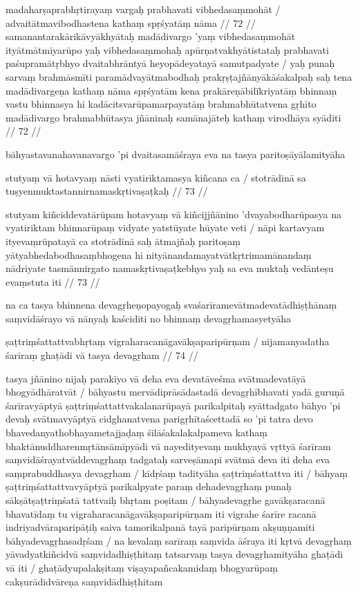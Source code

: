 madaharṣaprabhṛtirayaṃ vargaḥ prabhavati vibhedasaṃmohāt  /
advaitātmavibodhastena kathaṃ spṛśyatāṃ nāma  // 72  //
samanantarakārikāvyākhyātaḥ madādivargo 'yaṃ vibhedasaṃmohāt ityātmātmīyarūpo yaḥ vibhedasaṃmohaḥ apūrṇatvakhyātistataḥ prabhavati paśupramātṛbhyo dvaitabhrāntyā heyopādeyatayā samutpadyate  / yaḥ punaḥ sarvaṃ brahmāsmīti paramādvayātmabodhaḥ prakṛṣṭajñānyākāśakalpaḥ saḥ tena madādivargeṇa kathaṃ nāma spṛśyatām kena prakāreṇābilīkriyatāṃ bhinnaṃ vastu bhinnasya hi kadācitsvarūpamarpayatāṃ brahmabhūtatvena gṛhīto madādivargo brahmabhūtasya jñāninaḥ samānajāteḥ kathaṃ virodhāya syāditi  // 72  //

bāhyastavanahavanavargo 'pi dvaitasamāśraya eva na tasya paritoṣāyālamityāha

stutyaṃ vā hotavyaṃ nāsti vyatiriktamasya kiñcana ca  /
stotrādinā sa tuṣyenmuktastannirnamaskṛtivaṣaṭkaḥ  // 73  //

stutyam kiñciddevatārūpam hotavyaṃ vā kiñcijjñānino 'dvayabodharūpasya na vyatiriktam bhinnarūpaṃ vidyate yatstūyate hūyate veti  / nāpi kartavyam ityevaṃrūpatayā ca stotrādinā saḥ ātmajñaḥ paritoṣaṃ yātyabhedabodhasaṃbhogena hi nityānandamayatvātkṛtrimamānandaṃ nādriyate tasmānnirgato namaskṛtivaṣaṭkebhyo yaḥ sa eva muktaḥ vedānteṣu evaṃstuta iti  // 73  //

na ca tasya bhinnena devagṛheṇopayogaḥ svaśarīramevātmadevatādhiṣṭhānaṃ saṃvidāśrayo vā nānyaḥ kaściditi no bhinnaṃ devagṛhamasyetyāha

ṣaṭtriṃśattattvabhṛtaṃ vigraharacanāgavākṣaparipūrṇam  /
nijamanyadatha śarīraṃ ghaṭādi vā tasya devagṛham  // 74  //

tasya jñānino nijaḥ parakīyo vā deha eva devatāveśma svātmadevatāyā bhogyādhāratvāt  / bāhyastu mervādiprāsādastadā devagṛhībhavati yadā guruṇā śarīravyāptyā ṣaṭtriṃśattattvakalanarūpayā parikalpitaḥ syāttadgato bāhyo 'pi devaḥ svātmavyāptyā cidghanatvena parigṛhītaścettadā so 'pi tatra devo bhavedanyathobhayametajjaḍaṃ śilāśakalakalpameva kathaṃ bhaktānuddharenmṛtānsāmīpyādi vā nayedityevaṃ mukhyayā vṛttyā śarīram saṃvidāśrayatvāddevagṛhaṃ tadgataḥ sarveṣāmapi svātmā deva iti deha eva saṃprabuddhasya devagṛham  / kīdṛśaṃ tadityāha ṣaṭtriṃśattattva iti  / bāhyaṃ ṣaṭtriṃśattattvavyāptyā parikalpyate paraṃ dehadevagṛhaṃ punaḥ sākṣātṣaṭtriṃśatā tattvaiḥ bhṛtam poṣitam  / bāhyadevagṛhe gavākṣaracanā bhavatīdaṃ tu vigraharacanāgavākṣaparipūrṇam iti vigrahe śarīre racanā indriyadvāraparipāṭiḥ saiva tamorikalpanā tayā paripūrṇam akṣuṇṇamiti bāhyadevagṛhasadṛśam  / na kevalaṃ sarīraṃ saṃvida āśraya iti kṛtvā devagṛhaṃ yāvadyatkiñcidvā saṃvidadhiṣṭhitaṃ tatsarvaṃ tasya devagṛhamityāha ghaṭādi vā iti  / ghaṭādyupalakṣitaṃ viṣayapañcakamidaṃ bhogyarūpaṃ cakṣurādidvāreṇa saṃvidādhiṣṭhitam

